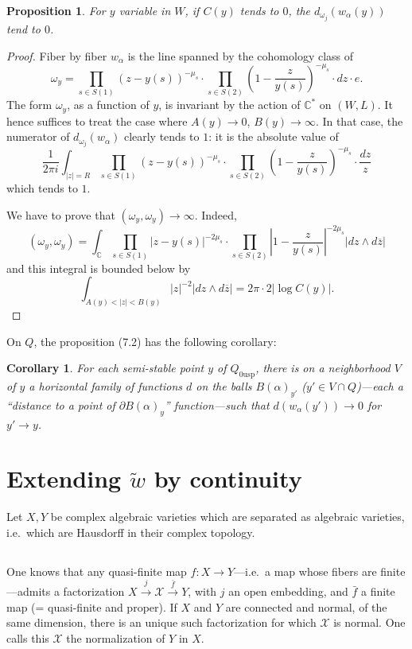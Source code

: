 \documentclass[12pt,a4paper]{article}
\theoremstyle{plain}
\newtheorem{proposition}[theorem]{Proposition}
\newtheorem{corollary}[theorem]{Corollary}
\theoremstyle{definition}
\theoremstyle{remark}
\newcommand{\CC}{\mathbb{C}}
\numberwithin{equation}{section}
\providecommand{\CC}{\mathbb{C}}
\begin{document}
\begin{proposition}\label{prop:7.2}
For $y$ variable in $W$, if $C(y)$ tends to $0$, the $d_{\omega_j}(w_\alpha(y))$ tend to $0$.
\end{proposition}

\begin{proof}
Fiber by fiber $w_\alpha$ is the line spanned by the cohomology class of
\[
\omega_y = \prod_{s \in S(1)} (z - y(s))^{-\mu_s} \cdot \prod_{s \in S(2)} \left(1 - \frac{z}{y(s)}\right)^{-\mu_s} \cdot dz \cdot e.
\]
The form $\omega_y$, as a function of $y$, is invariant by the action of $\CC^*$ on $(W, L)$. It hence suffices to treat the case where $A(y) \to 0$, $B(y) \to \infty$. In that case, the numerator of $d_{\omega_j}(w_\alpha)$ clearly tends to $1$: it is the absolute value of
\[
\frac{1}{2\pi i} \int_{|z|=R} \prod_{s \in S(1)} (z - y(s))^{-\mu_s} \cdot \prod_{s \in S(2)} \left(1 - \frac{z}{y(s)}\right)^{-\mu_s} \cdot \frac{dz}{z}
\]
which tends to $1$.

We have to prove that $(\omega_y, \omega_y) \to \infty$. Indeed,
\[
(\omega_y, \omega_y) = \int_{\CC} \prod_{s \in S(1)} |z - y(s)|^{-2\mu_s} \cdot \prod_{s \in S(2)} \left|1 - \frac{z}{y(s)}\right|^{-2\mu_s} |dz \wedge d\overline{z}|
\]
and this integral is bounded below by
\[
\int_{A(y) < |z| < B(y)} |z|^{-2} |dz \wedge d\overline{z}| = 2\pi \cdot 2 |\log C(y)|.
\]
\end{proof}

On $Q$, the proposition (7.2) has the following corollary:
\begin{corollary}\label{cor:7.3}
For each semi-stable point $y$ of $Q_{0\mathrm{usp}}$, there is on a neighborhood $V$ of $y$ a horizontal family of functions $d$ on the balls $B(\alpha)_{y'}$ ($y' \in V \cap Q$)---each a ``distance to a point of $\partial B(\alpha)_y$'' function---such that $d(w_\alpha(y')) \to 0$ for $y' \to y$.
\end{corollary}


\section{Extending $\widetilde{w}$ by continuity}

Let $X, Y$ be complex algebraic varieties which are separated as algebraic varieties, i.e.\ which are Hausdorff in their complex topology.

\subsection{}
One knows that any quasi-finite map $f: X \to Y$---i.e.\ a map whose fibers are finite---admits a factorization $X \xrightarrow{j} \mathcal{X} \xrightarrow{\bar{f}} Y$, with $j$ an open embedding, and $\bar{f}$ a finite map (= quasi-finite and proper). If $X$ and $Y$ are connected and normal, of the same dimension, there is an unique such factorization for which $\mathcal{X}$ is normal. One calls this $\mathcal{X}$ the normalization of $Y$ in $X$.
\end{document}
